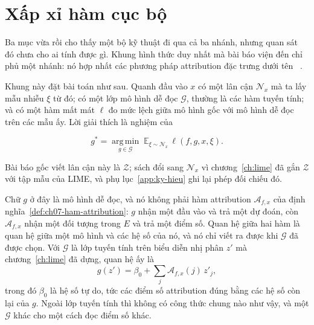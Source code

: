 \section{Xấp xỉ hàm cục bộ}
\label{sec:ch07-xap-xi-ham-cuc-bo}

%
%
Ba mục vừa rồi cho thấy một bộ kỹ thuật đi qua cả ba nhánh, nhưng quan sát đó
chưa cho ai tính được gì. Khung hình thức duy nhất mà bài báo viện đến chỉ phủ
một nhánh: nó hợp nhất các phương pháp attribution đặc trưng dưới tên
~\autocite{p18unified}.

Khung này đặt bài toán như sau. Quanh đầu vào $x$ có một lân cận $\mathcal{N}_x$
mà ta lấy mẫu nhiễu $\xi$ từ đó; có một lớp mô hình dễ đọc $\mathcal{G}$, thường
là các hàm tuyến tính; và có một hàm mất mát $\ell$ đo mức lệch giữa mô hình gốc
với mô hình dễ đọc trên các mẫu ấy. Lời giải thích là nghiệm của

\begin{equation}
\label{eq:ch07-lfa}
g^{*} = \operatorname*{arg\,min}_{g \in \mathcal{G}}\;
        \mathbb{E}_{\xi \sim \mathcal{N}_x}\,\ell(f, g, x, \xi).
\end{equation}

Bài báo gốc viết lân cận này là $\mathcal{Z}$; sách đổi sang $\mathcal{N}_x$ vì
chương~\ref{ch:lime} đã gắn $\mathcal{Z}$ với tập mẫu của LIME, và
phụ lục~\ref{app:ky-hieu} ghi lại phép đối chiếu đó.

Chữ $g$ ở đây là mô hình dễ đọc, và nó không phải hàm attribution
$\mathcal{A}_{f,x}$ của định nghĩa~\ref{def:ch07-ham-attribution}: $g$ nhận một
đầu vào và trả một dự đoán, còn $\mathcal{A}_{f,x}$ nhận một đối tượng trong $E$
và trả một điểm số. Quan hệ giữa hai hàm là quan hệ giữa một mô hình và các hệ
số của nó, và nó chỉ viết ra được khi $\mathcal{G}$ đã được chọn. Với
$\mathcal{G}$ là lớp tuyến tính trên biểu diễn nhị phân $z'$ mà
chương~\ref{ch:lime} đã dựng, quan hệ ấy là
\[
  g(z') = \beta_0 + \sum_j \mathcal{A}_{f,x}(j)\, z'_j ,
\]
trong đó $\beta_0$ là hệ số tự do, tức các điểm số attribution đúng bằng các hệ
số còn lại của $g$. Ngoài lớp tuyến tính
thì không có công thức chung nào như vậy, và một $\mathcal{G}$ khác cho một cách
đọc điểm số khác.

